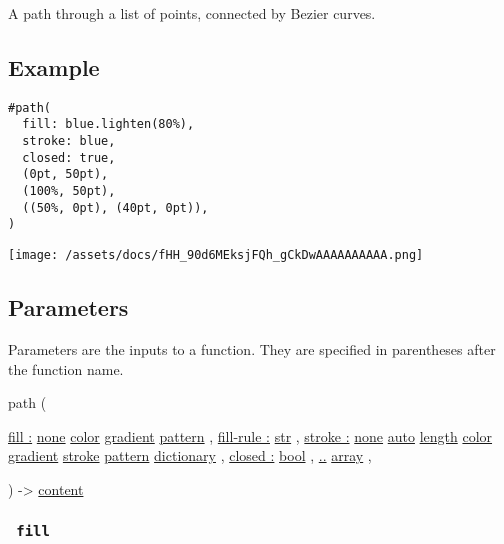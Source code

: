 A path through a list of points, connected by Bezier curves.

\subsection{Example}\label{example}

\begin{verbatim}
#path(
  fill: blue.lighten(80%),
  stroke: blue,
  closed: true,
  (0pt, 50pt),
  (100%, 50pt),
  ((50%, 0pt), (40pt, 0pt)),
)
\end{verbatim}

\texttt{[image: /assets/docs/fHH\_90d6MEksjFQh\_gCkDwAAAAAAAAAA.png]}

\subsection{\texorpdfstring{{ Parameters
}}{ Parameters }}\label{parameters}

\label{parameters-tooltip}
Parameters are the inputs to a function. They are specified in
parentheses after the function name.

{ path } (

{ \hyperref[parameters-fill]{fill :}
\href{/docs/reference/foundations/none/}{none}
\href{/docs/reference/visualize/color/}{color}
\href{/docs/reference/visualize/gradient/}{gradient}
\href{/docs/reference/visualize/pattern/}{pattern} , } {
\hyperref[parameters-fill-rule]{fill-rule :}
\href{/docs/reference/foundations/str/}{str} , } {
\hyperref[parameters-stroke]{stroke :}
\href{/docs/reference/foundations/none/}{none}
\href{/docs/reference/foundations/auto/}{auto}
\href{/docs/reference/layout/length/}{length}
\href{/docs/reference/visualize/color/}{color}
\href{/docs/reference/visualize/gradient/}{gradient}
\href{/docs/reference/visualize/stroke/}{stroke}
\href{/docs/reference/visualize/pattern/}{pattern}
\href{/docs/reference/foundations/dictionary/}{dictionary} , } {
\hyperref[parameters-closed]{closed :}
\href{/docs/reference/foundations/bool/}{bool} , } {
\hyperref[parameters-vertices]{..}
\href{/docs/reference/foundations/array/}{array} , }

) -\textgreater{} \href{/docs/reference/foundations/content/}{content}

\subsubsection{\texorpdfstring{\texttt{\ fill\ }}{ fill }}\label{parameters-fill}

